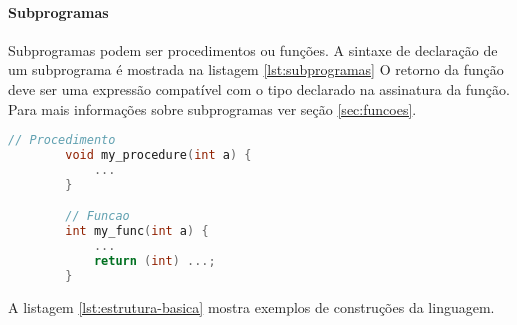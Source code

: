 \paragraph{Subprogramas} Subprogramas podem ser procedimentos ou funções.
A sintaxe de declaração de um subprograma é mostrada na listagem \ref{lst:subprogramas}
O retorno da função deve ser uma expressão compatível com o tipo declarado na assinatura da função.
Para mais informações sobre subprogramas ver seção \ref{sec:funcoes}.
\begin{lstlisting}[language=C, caption=Declaração de subprogramas, label=lst:subprogramas]
        // Procedimento
        void my_procedure(int a) {
            ...
        }

        // Funcao
        int my_func(int a) {
            ...
            return (int) ...;
        }
\end{lstlisting}


A listagem \ref{lst:estrutura-basica} mostra exemplos de construções da linguagem.






